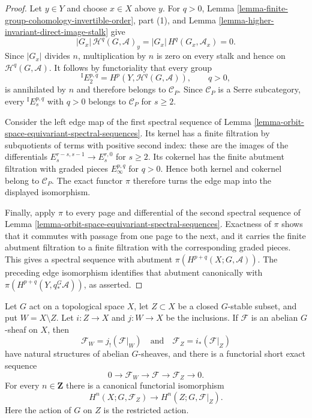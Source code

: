 \begin{proof}
Let $y\in Y$ and choose $x\in X$ above $y$. For $q>0$, Lemma
\ref{lemma-finite-group-cohomology-invertible-order}, part (1), and Lemma
\ref{lemma-higher-invariant-direct-image-stalk} give
$$
|G_x|\,\mathcal{H}^q(G,\mathcal{A})_y
=|G_x|\,H^q(G_x,\mathcal{A}_x)=0.
$$
Since $|G_x|$ divides $n$, multiplication by $n$ is zero on every stalk and
hence on $\mathcal{H}^q(G,\mathcal{A})$. It follows by functoriality that
every group
$$
{}^{\mathrm I}E_2^{p,q}
=H^p(Y,\mathcal{H}^q(G,\mathcal{A})),\qquad q>0,
$$
is annihilated by $n$ and therefore belongs to $\mathcal{C}_P$.
Since $\mathcal{C}_P$ is a Serre subcategory, every
${}^{\mathrm I}E_s^{p,q}$ with $q>0$ belongs to $\mathcal{C}_P$ for
$s\geq2$.

Consider the left edge map of the first spectral sequence of Lemma
\ref{lemma-orbit-space-equivariant-spectral-sequences}. Its kernel has a
finite filtration by subquotients of terms with positive second index: these
are the images of the differentials
$E_s^{r-s,s-1}\to E_s^{r,0}$ for $s\geq2$. Its cokernel has the finite
abutment filtration with graded pieces $E_\infty^{p,q}$ for $q>0$. Hence
both kernel and cokernel belong to $\mathcal{C}_P$. The exact functor $\pi$
therefore turns the edge map into the displayed isomorphism.

Finally, apply $\pi$ to every page and differential of the second spectral
sequence of Lemma
\ref{lemma-orbit-space-equivariant-spectral-sequences}. Exactness of $\pi$
shows that it commutes with passage from one page to the next, and it carries
the finite abutment filtration to a finite filtration with the corresponding
graded pieces. This gives a spectral sequence with abutment
$\pi(H^{p+q}(X;G,\mathcal{A}))$. The preceding edge isomorphism identifies
that abutment canonically with
$\pi(H^{p+q}(Y,q_*^G\mathcal{A}))$, as asserted.
\end{proof}


\begin{lemma}
\label{lemma-equivariant-support-excision}
Let $G$ act on a topological space $X$, let $Z \subset X$ be a closed
$G$-stable subset, and put $W = X \setminus Z$. Let $i : Z \to X$ and
$j : W \to X$ be the inclusions. If $\mathcal{F}$ is an abelian $G$-sheaf
on $X$, then
$$
\mathcal{F}_W = j_!(\mathcal{F}|_W)
\quad\text{and}\quad
\mathcal{F}_Z = i_*(\mathcal{F}|_Z)
$$
have natural structures of abelian $G$-sheaves, and there is a functorial
short exact sequence
$$
0 \longrightarrow \mathcal{F}_W \longrightarrow \mathcal{F}
\longrightarrow \mathcal{F}_Z \longrightarrow 0.
$$
For every $n \in \mathbf{Z}$ there is a canonical functorial isomorphism
$$
H^n(X;G,\mathcal{F}_Z)
\longrightarrow
H^n(Z;G,\mathcal{F}|_Z).
$$
Here the action of $G$ on $Z$ is the restricted action.
\end{lemma}

